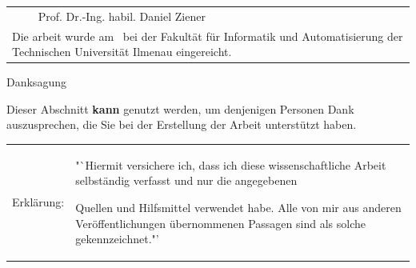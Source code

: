 \begin{titlepage}
\begin{center}
\begin{table}[ht]
\begin{tabular}{ll}
				          & Prof. Dr.-Ing. habil. Daniel Ziener       \\[2cm]
				\multicolumn{2}{p{13cm}}{Die \settingsDegree arbeit wurde am \settingsFinishDate \ bei der Fakultät für Informatik und Automatisierung der Technischen Universität Ilmenau eingereicht.}
			\end{tabular}
		\end{table}
	\end{center}
\end{titlepage}

\cleardoublepage

\vspace*{5cm}

Danksagung

Dieser Abschnitt {\bf kann} genutzt werden, um denjenigen Personen Dank auszusprechen, die Sie bei der Erstellung der Arbeit unterstützt haben.

\cleardoublepage

\vspace*{16cm}

\begin{tabular}{lp{12.5cm}}
	{Erklärung:} & {"`Hiermit versichere ich, dass ich diese wissenschaftliche Arbeit selbständig verfasst und nur die angegebenen

			
			
			
			
			
			
			
			
			
			
			Quellen und Hilfsmittel verwendet habe. Alle von mir aus anderen
			Veröffentlichungen übernommenen Passagen sind als solche gekennzeichnet."'}
\end{tabular}
\vspace*{1.5cm}

